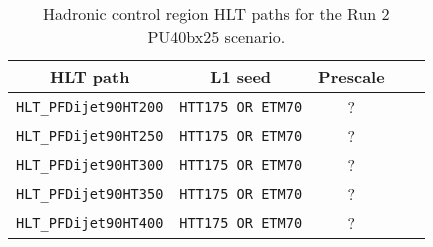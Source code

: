 \begin{table}[h!]
\footnotesize
\centering
\begin{tabular}{|c||c|c|c||c|} 
\hline
HLT path & L1 seed & Prescale \\[0.7 ex] 
\hline
\verb!HLT_PFDijet90HT200! & \verb!HTT175 OR ETM70! & ? \\
\verb!HLT_PFDijet90HT250! & \verb!HTT175 OR ETM70! & ? \\
\verb!HLT_PFDijet90HT300! & \verb!HTT175 OR ETM70! & ? \\
\verb!HLT_PFDijet90HT350! & \verb!HTT175 OR ETM70! & ? \\
\verb!HLT_PFDijet90HT400! & \verb!HTT175 OR ETM70! & ? \\
\hline


\end{tabular}
\caption{Hadronic control region HLT paths for the Run 2 PU40bx25 scenario. }
\label{tab:2015_Hadronic_Triggers}
\end{table}











